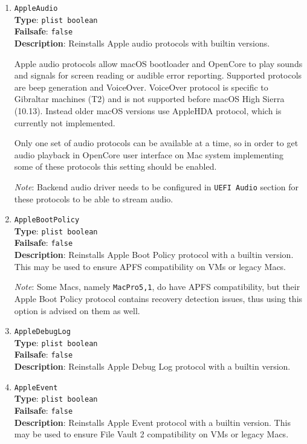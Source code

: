 \documentclass[]{article}
\begin{document}
\begin{enumerate}

\item
  \texttt{AppleAudio}\\
  \textbf{Type}: \texttt{plist\ boolean}\\
  \textbf{Failsafe}: \texttt{false}\\
  \textbf{Description}: Reinstalls Apple audio protocols with builtin
  versions.

  Apple audio protocols allow macOS bootloader and OpenCore to play
  sounds and signals for screen reading or audible error reporting.
  Supported protocols are beep generation and VoiceOver. VoiceOver protocol
  is specific to Gibraltar machines (T2) and is not supported before
  macOS High Sierra (10.13). Instead older macOS versions use AppleHDA protocol,
  which is currently not implemented.

  Only one set of audio protocols can be available at a time, so in order
  to get audio playback in OpenCore user interface on Mac system implementing some
  of these protocols this setting should be enabled.

  \emph{Note}: Backend audio driver needs to be configured in \texttt{UEFI Audio}
  section for these protocols to be able to stream audio.

\item
  \texttt{AppleBootPolicy}\\
  \textbf{Type}: \texttt{plist\ boolean}\\
  \textbf{Failsafe}: \texttt{false}\\
  \textbf{Description}: Reinstalls Apple Boot Policy protocol with a builtin
  version. This may be used to ensure APFS compatibility on VMs or legacy Macs.

  \emph{Note}: Some Macs, namely \texttt{MacPro5,1}, do have APFS compatibility,
  but their Apple Boot Policy protocol contains recovery detection issues, thus
  using this option is advised on them as well.

\item
  \texttt{AppleDebugLog}\\
  \textbf{Type}: \texttt{plist\ boolean}\\
  \textbf{Failsafe}: \texttt{false}\\
  \textbf{Description}: Reinstalls Apple Debug Log protocol with a builtin
  version.

\item
  \texttt{AppleEvent}\\
  \textbf{Type}: \texttt{plist\ boolean}\\
  \textbf{Failsafe}: \texttt{false}\\
  \textbf{Description}: Reinstalls Apple Event protocol with a builtin
  version. This may be used to ensure File Vault 2 compatibility on VMs or legacy Macs.


\end{enumerate}
\end{document}
